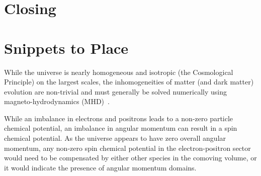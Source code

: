 \documentclass[a4paper]{article}
\begin{document}

\section{Closing}\label{sec:conclusions}

\section{Snippets to Place}
While the universe is nearly homogeneous and isotropic (the Cosmological Principle) on the largest scales, the inhomogeneities of matter (and dark matter) evolution are non-trivial and must generally be solved numerically using magneto-hydrodynamics (MHD)~\cite{melrose2008quantum,vazza2017simulations}.

While an imbalance in electrons and positrons leads to a non-zero particle chemical potential, an imbalance in angular momentum can result in a spin chemical potential. As the universe appears to have zero overall angular momentum, any non-zero spin chemical potential in the electron-positron sector would need to be compensated by either other species in the comoving volume, or it would indicate the presence of angular momentum domains.




\end{document}
